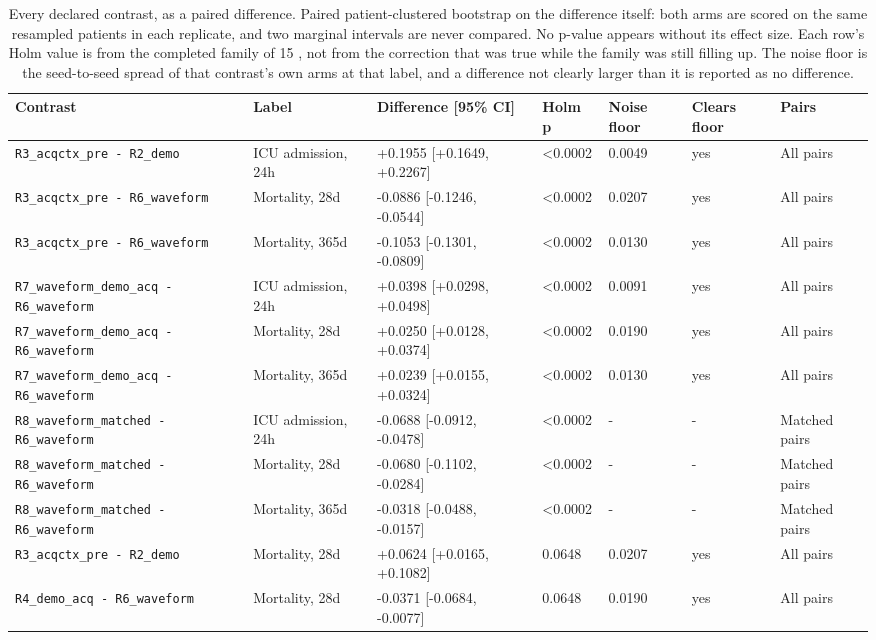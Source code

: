 \begin{table}[t]
\centering
\small
\caption{Every declared contrast, as a paired difference. Paired patient-clustered bootstrap on the difference itself: both arms are scored on the same resampled patients in each replicate, and two marginal intervals are never compared. No p-value appears without its effect size. Each row's Holm value is from the completed family of 15 , not from the correction that was true while the family was still filling up. The noise floor is the seed-to-seed spread of that contrast's own arms at that label, and a difference not clearly larger than it is reported as no difference.}
\label{tab:contrasts}
\begin{tabular}{lllllll}
\toprule
Contrast & Label & Difference [95\% CI] & Holm p & Noise floor & Clears floor & Pairs \\
\midrule
\texttt{R3\_acqctx\_pre - R2\_demo} & ICU admission, 24h & +0.1955 [+0.1649, +0.2267] & <0.0002 & 0.0049 & yes & All pairs \\
\texttt{R3\_acqctx\_pre - R6\_waveform} & Mortality, 28d & -0.0886 [-0.1246, -0.0544] & <0.0002 & 0.0207 & yes & All pairs \\
\texttt{R3\_acqctx\_pre - R6\_waveform} & Mortality, 365d & -0.1053 [-0.1301, -0.0809] & <0.0002 & 0.0130 & yes & All pairs \\
\texttt{R7\_waveform\_demo\_acq - R6\_waveform} & ICU admission, 24h & +0.0398 [+0.0298, +0.0498] & <0.0002 & 0.0091 & yes & All pairs \\
\texttt{R7\_waveform\_demo\_acq - R6\_waveform} & Mortality, 28d & +0.0250 [+0.0128, +0.0374] & <0.0002 & 0.0190 & yes & All pairs \\
\texttt{R7\_waveform\_demo\_acq - R6\_waveform} & Mortality, 365d & +0.0239 [+0.0155, +0.0324] & <0.0002 & 0.0130 & yes & All pairs \\
\texttt{R8\_waveform\_matched - R6\_waveform} & ICU admission, 24h & -0.0688 [-0.0912, -0.0478] & <0.0002 & - & - & Matched pairs \\
\texttt{R8\_waveform\_matched - R6\_waveform} & Mortality, 28d & -0.0680 [-0.1102, -0.0284] & <0.0002 & - & - & Matched pairs \\
\texttt{R8\_waveform\_matched - R6\_waveform} & Mortality, 365d & -0.0318 [-0.0488, -0.0157] & <0.0002 & - & - & Matched pairs \\
\texttt{R3\_acqctx\_pre - R2\_demo} & Mortality, 28d & +0.0624 [+0.0165, +0.1082] & 0.0648 & 0.0207 & yes & All pairs \\
\texttt{R4\_demo\_acq - R6\_waveform} & Mortality, 28d & -0.0371 [-0.0684, -0.0077] & 0.0648 & 0.0190 & yes & All pairs \\

\end{tabular}
\end{table}

